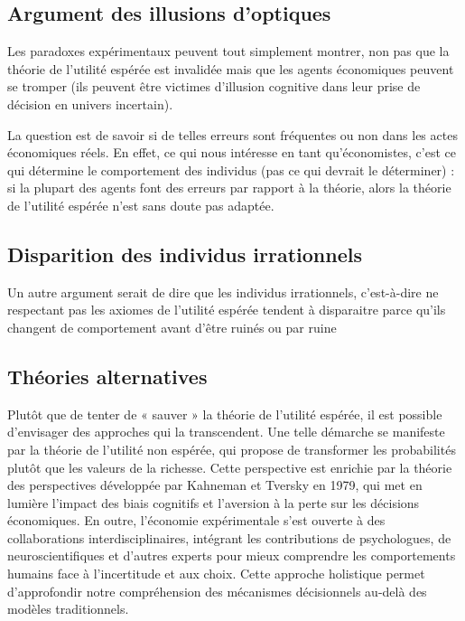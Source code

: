 \documentclass[a4paper, 12pt]{report}
\begin{document}
\subsection{Argument des illusions d'optiques}

Les paradoxes expérimentaux peuvent tout simplement montrer, non pas que la théorie de l'utilité espérée est invalidée mais que les agents économiques peuvent se tromper (ils peuvent être victimes d’illusion cognitive dans leur prise de décision en univers incertain).

La question est de savoir si de telles erreurs sont fréquentes ou non dans les actes économiques réels. En effet, ce qui nous intéresse en tant qu'économistes, c'est ce qui détermine le comportement des individus (pas
ce qui devrait le déterminer) : si la plupart des agents font des erreurs par rapport à la théorie, alors la théorie de l'utilité espérée n'est sans doute pas adaptée.

\subsection{Disparition des individus irrationnels}

Un autre argument serait de dire que les individus irrationnels, c'est-à-dire ne respectant pas les axiomes de l'utilité espérée tendent à disparaitre parce qu'ils changent de comportement avant d'être ruinés ou par ruine

\subsection{Théories alternatives}

Plutôt que de tenter de « sauver » la théorie de l'utilité espérée, il est possible d'envisager des approches qui la transcendent. Une telle démarche se manifeste par la théorie de l'utilité non espérée, qui propose de transformer les probabilités plutôt que les valeurs de la richesse. Cette perspective est enrichie par la théorie des perspectives développée par Kahneman et Tversky en 1979, qui met en lumière l'impact des biais cognitifs et l'aversion à la perte sur les décisions économiques. En outre, l'économie expérimentale s'est ouverte à des collaborations interdisciplinaires, intégrant les contributions de psychologues, de neuroscientifiques et d'autres experts pour mieux comprendre les comportements humains face à l'incertitude et aux choix. Cette approche holistique permet d'approfondir notre compréhension des mécanismes décisionnels au-delà des modèles traditionnels.
\end{document}
